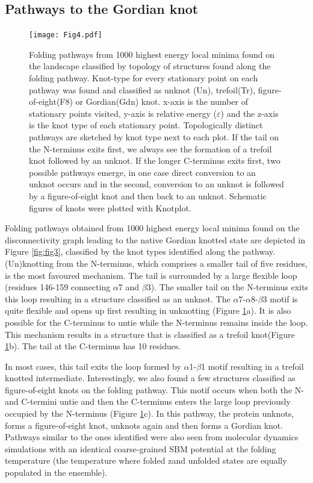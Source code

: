 \documentclass[journal=jacsat]{achemso}
\begin{document}
\subsection{Pathways to the	Gordian knot}
\begin{figure}
    \centering
    \texttt{[image: Fig4.pdf]}
    \caption{Folding pathways from 1000 highest energy local minima found on the landscape classified by topology of structures found along the folding pathway. Knot-type for every stationary point on each pathway was found and classified as unknot (Un), trefoil(Tr), figure-of-eight(F8) or Gordian(Gdn) knot. x-axis is the number of stationary points visited, y-axis is relative energy ($\varepsilon$) and the z-axis is the knot type of each stationary point. Topologically distinct pathways are sketched by knot type next to each plot. If the tail on the N-terminus exits first, we always see the formation of a trefoil knot followed by an unknot. If the longer C-terminus exits first, two possible pathways emerge, in one case direct conversion to an unknot occurs and in the second, conversion to an unknot is followed by a figure-of-eight knot and then back to an unknot. Schematic figures of knots were plotted with Knotplot\cite{knotplot}.}
    \label{fig:fig4}
\end{figure}
Folding pathways obtained from 1000 highest energy local minima found on the disconnectivity graph leading to the native Gordian knotted state are depicted in Figure \ref{fig:fig3}, classified by the knot types identified along the pathway. (Un)knotting from the N-terminus, which comprises a smaller tail of five residues, is the most favoured mechanism. The tail is surrounded by a large flexible loop (residues 146-159 connecting $\alpha$7 and $\beta$3). The smaller tail on the N-terminus exits this loop resulting in a structure classified as an unknot. The $\alpha$7-$\alpha$8-$\beta$3 motif is quite flexible and opens up first resulting in unknotting (Figure \ref{fig:fig4}a). It is also possible for the C-terminus to untie while the N-terminus remains inside the loop. This mechanism results in a structure that is classified as a trefoil knot(Figure \ref{fig:fig4}b). The tail at the C-terminus has 10 residues. 

In most cases, this tail exits the loop formed by $\alpha$1-$\beta$1 motif resulting in a trefoil knotted intermediate. Interestingly, we also found a few structures classified as figure-of-eight knots on the folding pathway. This motif occurs when both the N- and C-termini untie and then the C-terminus enters the large loop previously occupied by the N-terminus (Figure \ref{fig:fig4}c). In this pathway, the protein unknots, forms a figure-of-eight knot, unknots again and then forms a Gordian knot.  Pathways similar to the ones identified were also seen from molecular dynamics simulations with an identical coarse-grained SBM potential\cite{Zhao18a} at the folding temperature (the temperature where folded zand unfolded states are equally populated in the ensemble). 
\end{document}
